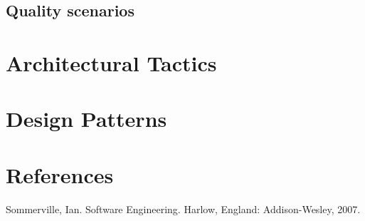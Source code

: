 \documentclass{article}
\begin{document}
\subsection{Quality scenarios}


\section{Architectural Tactics}

\section{Design Patterns}

\section{References}
Sommerville, Ian. Software Engineering. Harlow, England: Addison-Wesley, 2007.
\end{document}
